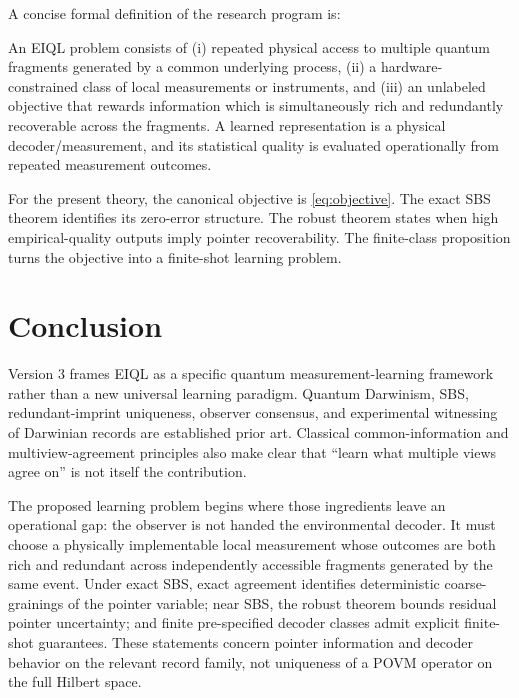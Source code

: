 A concise formal definition of the research program is:

\begin{definition}
An EIQL problem consists of (i) repeated physical access to multiple quantum fragments generated by a common underlying process, (ii) a hardware-constrained class of local measurements or instruments, and (iii) an unlabeled objective that rewards information which is simultaneously rich and redundantly recoverable across the fragments. A learned representation is a physical decoder/measurement, and its statistical quality is evaluated operationally from repeated measurement outcomes.
\end{definition}

For the present theory, the canonical objective is \cref{eq:objective}. The exact SBS theorem identifies its zero-error structure. The robust theorem states when high empirical-quality outputs imply pointer recoverability. The finite-class proposition turns the objective into a finite-shot learning problem.

\section{Conclusion}

Version 3 frames EIQL as a specific quantum measurement-learning framework rather than a new universal learning paradigm. Quantum Darwinism, SBS, redundant-imprint uniqueness, observer consensus, and experimental witnessing of Darwinian records are established prior art. Classical common-information and multiview-agreement principles also make clear that ``learn what multiple views agree on'' is not itself the contribution.

The proposed learning problem begins where those ingredients leave an operational gap: the observer is not handed the environmental decoder. It must choose a physically implementable local measurement whose outcomes are both rich and redundant across independently accessible fragments generated by the same event. Under exact SBS, exact agreement identifies deterministic coarse-grainings of the pointer variable; near SBS, the robust theorem bounds residual pointer uncertainty; and finite pre-specified decoder classes admit explicit finite-shot guarantees. These statements concern pointer information and decoder behavior on the relevant record family, not uniqueness of a POVM operator on the full Hilbert space.

